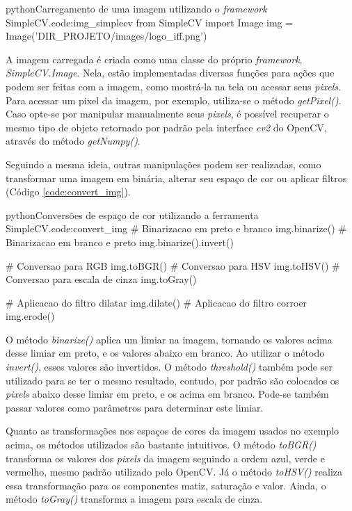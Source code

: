 \begin{code}{python}{Carregamento de uma imagem utilizando o \textit{framework} SimpleCV.}{code:img_simplecv}
from SimpleCV import Image
img = Image('DIR_PROJETO/images/logo_iff.png')
\end{code}

A imagem carregada é criada como uma classe do próprio \textit{framework}, \textit{SimpleCV.Image}. Nela, estão implementadas diversas funções para ações que podem ser feitas com a imagem, como mostrá-la na tela ou acessar seus \textit{pixels}. Para acessar um pixel da imagem, por exemplo, utiliza-se o método \textit{getPixel()}. Caso opte-se por manipular manualmente seus \textit{pixels}, é possível recuperar o mesmo tipo de objeto retornado por padrão pela interface \textit{cv2} do OpenCV, através do método \textit{getNumpy()}.

Seguindo a mesma ideia, outras manipulações podem ser realizadas, como transformar uma imagem em binária, alterar seu espaço de cor ou aplicar filtros (Código \ref{code:convert_img}).

\begin{code}{python}{Conversões de espaço de cor utilizando a ferramenta SimpleCV.}{code:convert_img}
# Binarizacao em preto e branco
img.binarize()
# Binarizacao em branco e preto
img.binarize().invert()

# Conversao para RGB
img.toBGR()
# Conversao para HSV
img.toHSV()
# Conversao para escala de cinza
img.toGray()

# Aplicacao do filtro dilatar
img.dilate()
# Aplicacao do filtro corroer
img.erode()
\end{code}

O método \textit{binarize()} aplica um limiar na imagem, tornando os valores acima desse limiar em preto, e os valores abaixo em branco. Ao utilizar o método \textit{invert()}, esses valores são invertidos. O método \textit{threshold()} também pode ser utilizado para se ter o mesmo resultado, contudo, por padrão são colocados os \textit{pixels} abaixo desse limiar em preto, e os acima em branco. Pode-se também passar valores como parâmetros para determinar este limiar.

Quanto as transformações nos espaços de cores da imagem usados no exemplo acima, os métodos utilizados são bastante intuitivos. O método \textit{toBGR()} transforma os valores dos \textit{pixels} da imagem seguindo a ordem azul, verde e vermelho, mesmo padrão utilizado pelo OpenCV. Já o método \textit{toHSV()} realiza essa transformação para os componentes matiz, saturação e valor. Ainda, o método \textit{toGray()} transforma a imagem para escala de cinza.

